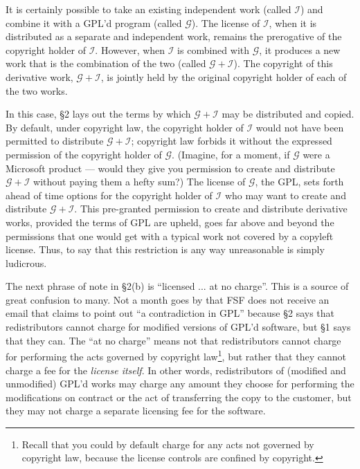 \documentclass[12pt]{report}
\begin{document}
\newcommand{\gplusi}{$\mathcal{G\!\!+\!\!I}$}
\newcommand{\worki}{$\mathcal{I}$}
\newcommand{\workg}{$\mathcal{G}$}

\label{separate-and-independent}

It is certainly possible to take an existing independent work (called
\worki{}) and combine it with a GPL'd program (called \workg{}).  The
license of \worki{}, when it is distributed as a separate and independent
work, remains the prerogative of the copyright holder of \worki{}.
However, when \worki{} is combined with \workg{}, it produces a new work
that is the combination of the two (called \gplusi{}).  The copyright of
this derivative work, \gplusi{}, is jointly held by the original copyright
holder of each of the two works.

In this case, \S 2 lays out the terms by which \gplusi{} may be
distributed and copied.  By default, under copyright law, the copyright
holder of \worki{} would not have been permitted to distribute \gplusi{};
copyright law forbids it without the expressed permission of the copyright
holder of \workg{}.  (Imagine, for a moment, if \workg{} were a Microsoft
product --- would they give you permission to create and distribute
\gplusi{} without paying them a hefty sum?)  The license of \workg{}, the
GPL, sets forth ahead of time options for the copyright holder of \worki{}
who may want to create and distribute \gplusi{}.  This pre-granted
permission to create and distribute derivative works, provided the terms
of GPL are upheld, goes far above and beyond the permissions that one
would get with a typical work not covered by a copyleft license.  Thus, to
say that this restriction is any way unreasonable is simply ludicrous.

\medskip

The next phrase of note in \S 2(b) is ``licensed ... at no charge''.  This
is a source of great confusion to many.  Not a month goes by that FSF does
not receive an email that claims to point out ``a contradiction in GPL''
because \S 2 says that redistributors cannot charge for modified versions
of GPL'd software, but \S 1 says that they can.  The ``at no charge''
means not that redistributors cannot charge for performing the acts
governed by copyright law\footnote{Recall that you could by default charge
  for any acts not governed by copyright law, because the license controls
  are confined by copyright.}, but rather that they cannot charge a fee
for the \emph{license itself}.  In other words, redistributors of
(modified and unmodified) GPL'd works may charge any amount they choose
for performing the modifications on contract or the act of transferring
the copy to the customer, but they may not charge a separate licensing fee
for the software.
\end{document}
